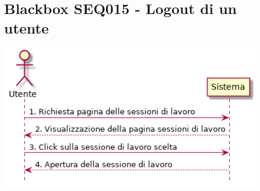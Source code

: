 \documentclass[../main.tex]{subfiles}
\begin{document}
\section{Blackbox SEQ015 - Logout di un utente }
\figure[H]
\centering
\includegraphics[width=14cm]{capitoli/usecases_diagrams/diagrams/SEQ015.png}
\endfigure
\end{document}
